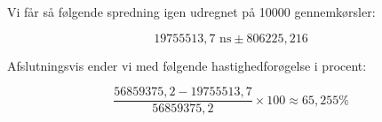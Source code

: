 \documentclass[class=report, crop=false]{standalone}
\begin{document}
    \noindent Vi får så følgende spredning igen udregnet på 10000 gennemkørsler:
    \begin{tcolorbox}
        \[ 19755513,7 \text{ ns} \pm 806225,216  \]
    \end{tcolorbox}

    \noindent Afslutningsvis ender vi med følgende hastighedforøgelse i procent:
    \begin{tcolorbox}
        \[ \frac{56859375,2 - 19755513,7}{56859375,2} \times 100 \approx 65,255\% \]
    \end{tcolorbox}
\end{document}
